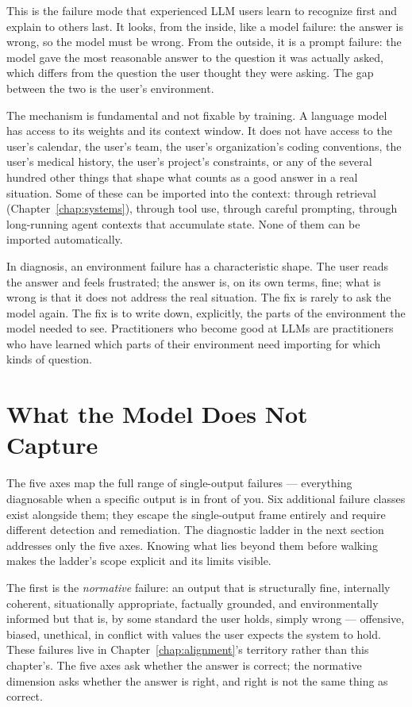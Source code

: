 This is the failure mode that experienced LLM users learn to
recognize first and explain to others last. It looks, from the
inside, like a model failure: the answer is wrong, so the model
must be wrong. From the outside, it is a prompt failure: the
model gave the most reasonable answer to the question it was
actually asked, which differs from the question the user thought
they were asking. The gap between the two is the user's
environment.

The mechanism is fundamental and not fixable by training. A
language model has access to its weights and its context window.
It does not have access to the user's calendar, the user's team,
the user's organization's coding conventions, the user's medical
history, the user's project's constraints, or any of the several
hundred other things that shape what counts as a good answer in a
real situation. Some of these can be imported into the context:
through retrieval (Chapter~\ref{chap:systems}), through tool use, through careful
prompting, through long-running agent contexts that accumulate
state. None of them can be imported automatically.

In diagnosis, an environment failure has a characteristic shape.
The user reads the answer and feels frustrated; the answer is, on
its own terms, fine; what is wrong is that it does not address
the real situation. The fix is rarely to ask the model again. The
fix is to write down, explicitly, the parts of the environment the
model needed to see. Practitioners who become good at LLMs are
practitioners who have learned which parts of their environment
need importing for which kinds of question.

\section{What the Model Does Not Capture}

The five axes map the full range of single-output failures ---
everything diagnosable when a specific output is in front of you.
Six additional failure classes exist alongside them; they escape
the single-output frame entirely and require different detection
and remediation. The diagnostic ladder in the next section
addresses only the five axes. Knowing what lies beyond them before
walking makes the ladder's scope explicit and its limits visible.

The first is the \emph{normative} failure: an output that is
structurally fine, internally coherent, situationally appropriate,
factually grounded, and environmentally informed but that is, by
some standard the user holds, simply wrong --- offensive, biased,
unethical, in conflict with values the user expects the system to
hold. These failures live in Chapter~\ref{chap:alignment}'s territory rather than
this chapter's. The five axes ask whether the answer is correct;
the normative dimension asks whether the answer is right, and
right is not the same thing as correct.

